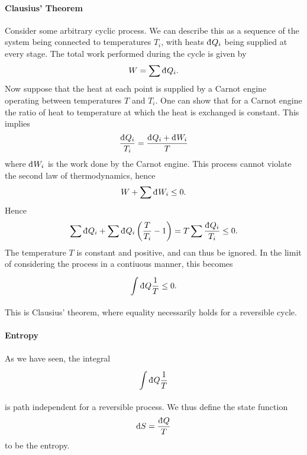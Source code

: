 
\paragraph{Clausius' Theorem}
Consider some arbitrary cyclic process. We can describe this as a sequence of the system being connected to temperatures $T_{i}$, with heats $\din{Q_{i}}$ being supplied at every stage. The total work performed during the cycle is given by
\begin{align*}
	W = \sum\din{Q_{i}}.
\end{align*}
Now suppose that the heat at each point is supplied by a Carnot engine operating between temperatures $T$ and $T_{i}$. One can show that for a Carnot engine the ratio of heat to temperature at which the heat is exchanged is constant. This implies
\begin{align*}
	\frac{\din{Q_{i}}}{T_{i}} = \frac{\din{Q_{i}} + \din{W_{i}}}{T}
\end{align*}
where $\din{W_{i}}$ is the work done by the Carnot engine. This process cannot violate the second law of thermodynamics, hence
\begin{align*}
	W + \sum\din{W_{i}} \leq 0.
\end{align*}
Hence
\begin{align*}
	\sum\din{Q_{i}} + \sum\din{Q_{i}}\left(\frac{T}{T_{i}} - 1\right) = T\sum\frac{\din{Q_{i}}}{T_{i}} \leq 0.
\end{align*}
The temperature $T$ is constant and positive, and can thus be ignored. In the limit of considering the process in a contiuous manner, this becomes
\begin{align*}
	\intin{}{}{Q}{\frac{1}{T}} \leq 0.
\end{align*}
This is Clausius' theorem, where equality necessarily holds for a reversible cycle.

\paragraph{Entropy}
As we have seen, the integral
\begin{align*}
	\intin{}{}{Q}{\frac{1}{T}}
\end{align*}
is path independent for a reversible process. We thus define the state function
\begin{align*}
	\dd{S} = \frac{\din{Q}}{T}
\end{align*}
to be the entropy.

